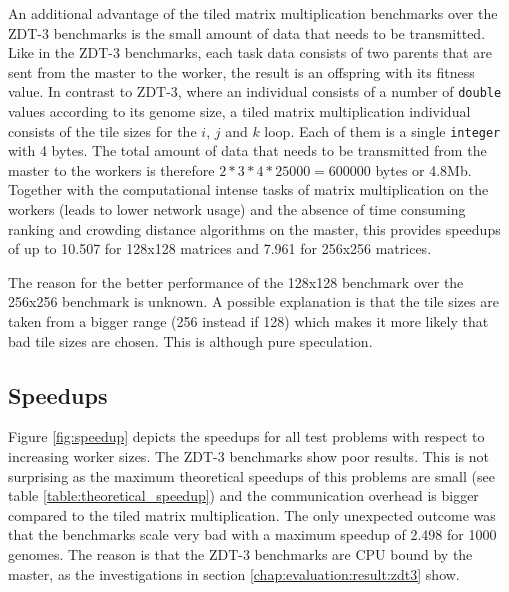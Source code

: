 An additional advantage of the tiled matrix multiplication benchmarks over the ZDT-3 benchmarks is the small amount of data that needs to be transmitted. Like in the ZDT-3 benchmarks, each task data consists of two parents that are sent from the master to the worker, the result is an offspring with its fitness value. In contrast to ZDT-3, where an individual consists of a number of \texttt{double} values according to its genome size, a tiled matrix multiplication individual consists of the tile sizes for the $i$, $j$ and $k$ loop. Each of them is a single \texttt{integer} with 4 bytes. The total amount of data that needs to be transmitted from the master to the workers is therefore $2 * 3 * 4 * 25000 = 600000$ bytes or 4.8Mb. Together with the computational intense tasks of matrix multiplication on the workers (leads to lower network usage) and the absence of time consuming ranking and crowding distance algorithms on the master, this provides speedups of up to 10.507 for 128x128 matrices and 7.961 for 256x256 matrices.

The reason for the better performance of the 128x128 benchmark over the 256x256 benchmark is unknown. A possible explanation is that the tile sizes are taken from a bigger range (256 instead if 128) which makes it more likely that bad tile sizes are chosen. This is although pure speculation.


\subsection{Speedups}
Figure \ref{fig:speedup} depicts the speedups for all test problems with respect to increasing worker sizes. The ZDT-3 benchmarks show poor results. This is not surprising as the maximum theoretical speedups of this problems are small (see table \ref{table:theoretical_speedup}) and the communication overhead is bigger compared to the tiled matrix multiplication. The only unexpected outcome was that the benchmarks scale very bad with a maximum speedup of 2.498 for 1000 genomes. The reason is that the ZDT-3 benchmarks are CPU bound by the master, as the investigations in section \ref{chap:evaluation:result:zdt3} show.

